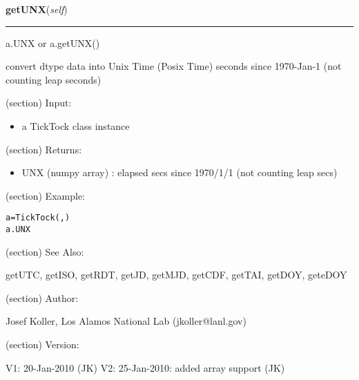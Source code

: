     \label{spacepy:spacetime:TickTock:getUNX}

    \vspace{0.5ex}

\hspace{.8\funcindent}\begin{boxedminipage}{\funcwidth}

    \raggedright \textbf{getUNX}(\textit{self})

    \vspace{-1.5ex}

    \rule{\textwidth}{0.5\fboxrule}
\setlength{\parskip}{2ex}
    a.UNX or a.getUNX()

    convert dtype data into Unix Time (Posix Time) seconds since 1970-Jan-1
    (not counting leap seconds)

    (section) Input:

      \begin{itemize}
      \setlength{\parskip}{0.6ex}
        \item a TickTock class instance

      \end{itemize}

    (section) Returns:

      \begin{itemize}
      \setlength{\parskip}{0.6ex}
        \item UNX (numpy array) : elapsed secs since 1970/1/1 (not counting 
          leap secs)

      \end{itemize}

    (section) Example:

\begin{alltt}
\pysrcprompt{{\textgreater}{\textgreater}{\textgreater} }a = TickTock(, )
\pysrcprompt{{\textgreater}{\textgreater}{\textgreater} }a.UNX
\end{alltt}
    (section) See Also:

      getUTC, getISO, getRDT, getJD, getMJD, getCDF, getTAI, getDOY, 
      geteDOY

    (section) Author:

      Josef Koller, Los Alamos National Lab (jkoller@lanl.gov)

    (section) Version:

      V1: 20-Jan-2010 (JK) V2: 25-Jan-2010: added array support (JK)

\setlength{\parskip}{1ex}
    \end{boxedminipage}

